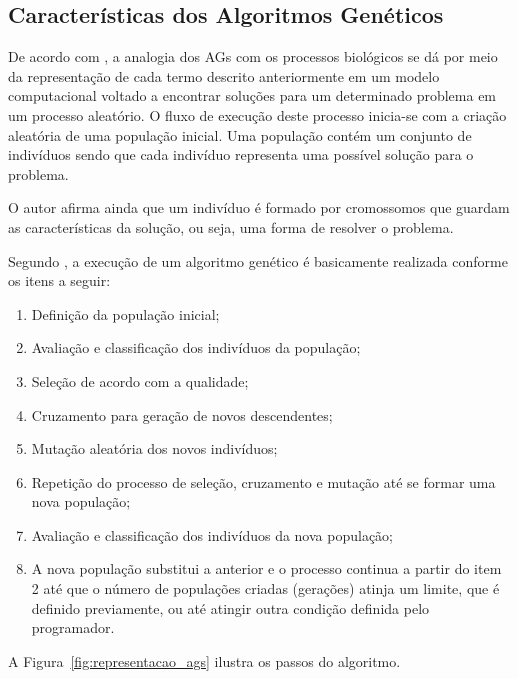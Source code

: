 \subsection{Características dos Algoritmos Genéticos}

\par De acordo com , a analogia dos AGs com
os processos biológicos se dá por meio da representação de cada termo descrito
anteriormente em um modelo computacional voltado a encontrar soluções para um
determinado problema em um processo aleatório. O fluxo de execução deste processo
inicia-se com a criação aleatória de uma população inicial. Uma população contém
um conjunto de indivíduos sendo que cada indivíduo  representa uma possível solução
para o problema.

\par O autor afirma ainda que um indivíduo é formado por cromossomos que
guardam as características da solução, ou seja, uma forma de resolver o
problema.

\par Segundo , a execução de um 
algoritmo genético é basicamente realizada conforme os itens a seguir:

\begin{enumerate}
	\item Definição da população inicial;
	\item Avaliação e classificação dos indivíduos da população;
	\item Seleção de acordo com a qualidade;
	\item Cruzamento para geração de novos descendentes;
	\item Mutação aleatória dos novos indivíduos;
	\item Repetição do processo de seleção, cruzamento e mutação até se formar uma nova população;
	\item Avaliação e classificação dos indivíduos da nova população;
	\item A nova população substitui a anterior e o processo continua a partir do
	item 2 até que o número de populações criadas (gerações) atinja um limite, que é definido
	previamente, ou até atingir outra condição definida pelo programador.
\end{enumerate}

\par A Figura~\ref{fig:representacao_ags} ilustra os passos do algoritmo.


